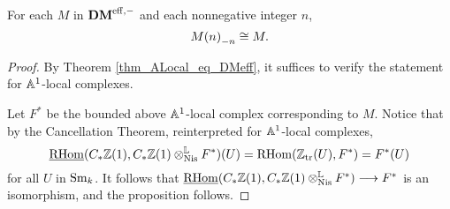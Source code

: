 \begin{prop}\label{prop_tZ_hZ_eq_id}
For each $M$ in $\DMeff$ and each nonnegative integer $n$, 
\[
\hZ[n]{\tZ[n]{M}} \cong M.
\]
\end{prop}
\begin{proof}
By Theorem \ref{thm_ALocal_eq_DMeff}, it suffices to verify the
statement for $\A^1$-local complexes. 

Let $F^*$ be the bounded above $\A^1$-local complex corresponding 
to $M$. Notice that by the Cancellation Theorem, reinterpreted for
$\A^1$-local complexes,
\[
\sheaf{\rhom}(\suslC \Z(1), \suslC \Z(1) \tLNis F^*)(U) = 
\rhom(\Ztr(U), F^*) = F^*(U)
\]
for all $U$ in $\Sm$. It follows that $\sheaf{\rhom}(\suslC\Z(1),
\suslC\Z(1) \tLNis F^*) \to F^*$ is an isomorphism, and the
proposition follows.
\end{proof}
